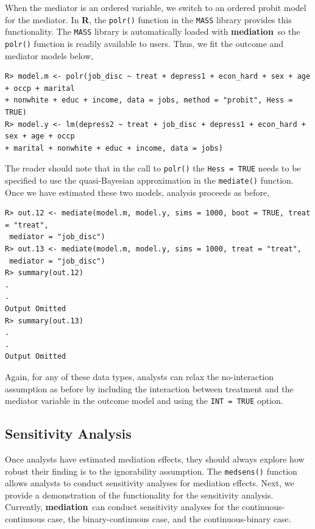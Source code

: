 \documentclass[11pt,letterpaper]{article}
\theoremstyle{plain}
\newcommand\bR{{\bf R}}
\newcommand\bmediation{{\bf mediation}}
\begin{document}
When the mediator is an ordered variable, we switch to an ordered
probit model for the mediator.  In \bR, the \texttt{polr()} function
in the \texttt{MASS} library provides this functionality.  The
\texttt{MASS} library is automatically loaded with \bmediation\, so
the \texttt{polr()} function is readily available to users.  Thus, we
fit the outcome and mediator models below,

\begin{verbatim}
R> model.m <- polr(job_disc ~ treat + depress1 + econ_hard + sex + age + occp + marital
+ nonwhite + educ + income, data = jobs, method = "probit", Hess = TRUE)
R> model.y <- lm(depress2 ~ treat + job_disc + depress1 + econ_hard + sex + age + occp
+ marital + nonwhite + educ + income, data = jobs)
\end{verbatim}

The reader should note that in the call to \texttt{polr()} the
\texttt{Hess = TRUE} needs to be specified to use the quasi-Bayesian
approximation in the \texttt{mediate()} function.  Once we have
estimated these two models, analysis proceeds as before,
\begin{verbatim}
R> out.12 <- mediate(model.m, model.y, sims = 1000, boot = TRUE, treat = "treat",
 mediator = "job_disc")
R> out.13 <- mediate(model.m, model.y, sims = 1000, treat = "treat",
 mediator = "job_disc")
R> summary(out.12)
.
.
Output Omitted
R> summary(out.13)
.
.
Output Omitted
\end{verbatim}
Again, for any of these data types, analysts can relax the
no-interaction assumption as before by including the interaction
between treatment and the mediator variable in the outcome model and
using the \texttt{INT = TRUE} option.

\subsection{Sensitivity Analysis}

Once analysts have estimated mediation effects, they should always
explore how robust their finding is to the ignorability assumption.
The \texttt{medsens()} function allows analysts to conduct sensitivity
analyses for mediation effects.  Next, we provide a demonstration of
the functionality for the sensitivity analysis.  Currently,
\bmediation\ can conduct sensitivity analyses for the
continuous-continuous case, the binary-continuous case, and the
continuous-binary case.
\end{document}
